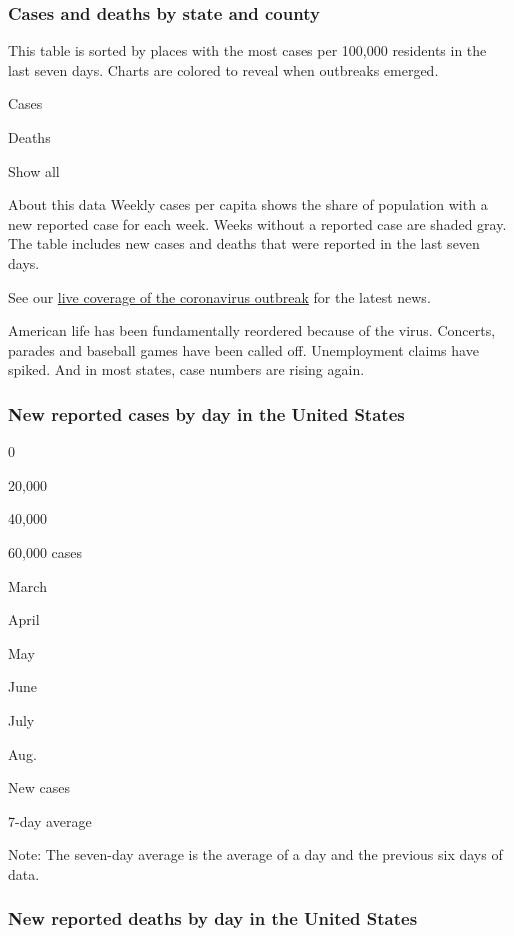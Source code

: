 \hypertarget{cases-and-deaths-by-state-and-county}{%
\subsubsection{Cases and deaths by state and
county}\label{cases-and-deaths-by-state-and-county}}

This table is sorted by places with the most cases per 100,000 residents
in the last seven days. Charts are colored to reveal when outbreaks
emerged.

Cases

Deaths

Show all

About this data Weekly cases per capita shows the share of population
with a new reported case for each week. Weeks without a reported case
are shaded gray. The table includes new cases and deaths that were
reported in the last seven days.

See our
\href{https://www.nytimes.com/2020/08/04/world/coronavirus-covid-19.html}{live
coverage of the coronavirus outbreak} for the latest news.

American life has been fundamentally reordered because of the virus.
Concerts, parades and baseball games have been called off. Unemployment
claims have spiked. And in most states, case numbers are rising again.

\hypertarget{new-reported-cases-by-day-in-the-united-states}{%
\subsubsection{New reported cases by day in the United
States}\label{new-reported-cases-by-day-in-the-united-states}}

0

20,000

40,000

60,000 cases

March

April

May

June

July

Aug.

New cases

7-day average

Note: The seven-day average is the average of a day and the previous six
days of data.

\hypertarget{new-reported-deaths-by-day-in-the-united-states}{%
\subsubsection{New reported deaths by day in the United
States}\label{new-reported-deaths-by-day-in-the-united-states}}

